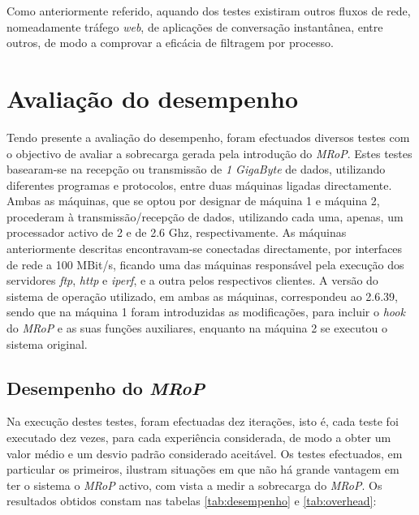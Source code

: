 Como anteriormente referido, aquando dos testes existiram outros fluxos de rede, nomeadamente tráfego \textit{web}, de aplicações de conversação instantânea, entre outros, de modo a comprovar a eficácia de filtragem por processo.

\section{Avaliação do desempenho}
\label{sec:eval_performance}

Tendo presente a avaliação do desempenho, foram efectuados diversos testes com o objectivo de avaliar a sobrecarga gerada pela introdução do \textit{MRoP}.
Estes testes basearam-se na recepção ou transmissão de \textit{1 GigaByte} de dados, utilizando diferentes programas e protocolos, entre duas máquinas ligadas directamente.
Ambas as máquinas, que se optou por designar de máquina 1 e máquina 2, procederam à transmissão/recepção de dados, utilizando cada uma, apenas, um processador activo de 2 e de 2.6 Ghz, respectivamente.
As máquinas anteriormente descritas encontravam-se conectadas directamente, por interfaces de rede a 100 MBit/s, ficando uma das máquinas responsável pela execução dos servidores \textit{ftp}, \textit{http} e \textit{iperf}, e a outra pelos respectivos clientes.
A versão do sistema de operação utilizado, em ambas as máquinas, correspondeu ao 2.6.39, sendo que na máquina 1 foram introduzidas as modificações, para incluir o \textit{hook} do \textit{MRoP} e as suas funções auxiliares, enquanto na máquina 2 se executou o sistema original.

\subsection{Desempenho do \textit{MRoP}}


Na execução destes testes, foram efectuadas dez iterações, isto é, cada teste foi executado dez vezes, para cada experiência considerada, de modo a obter um valor médio e um desvio padrão considerado aceitável.
Os testes efectuados, em particular os primeiros, ilustram situações em que não há grande vantagem em ter o sistema o \textit{MRoP} activo, com vista a medir a sobrecarga do \textit{MRoP}.
Os resultados obtidos constam nas tabelas \ref{tab:desempenho} e \ref{tab:overhead}:

